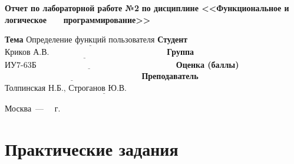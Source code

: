 \documentclass[12pt]{report}
\begin{document}
\begin{titlepage}
		\begin{center}
			\noindent\begin{minipage}{1.1\textwidth}\centering
				\Large\textbf{  Отчет по лабораторной работе №2}\newline
				\textbf{по дисциплине <<Функциональное и логическое}\newline
				\textbf{~~~программирование>>}\newline\newline
			\end{minipage}
		\end{center}
		
		\noindent\textbf{Тема} $\underline{\text{Определение функций пользователя}}$\newline\newline
		\noindent\textbf{Студент} $\underline{\text{Криков А.В.~~~~~~~~~~~~~~~~~~~~~~~~~~~~~~~~~~~~~~~~~~}}$\newline\newline
		\noindent\textbf{Группа} $\underline{\text{ИУ7-63Б~~~~~~~~~~~~~~~~~~~~~~~~~~~~~~~~~~~~~~~~~~~~~~~~~~}}$\newline\newline
		\noindent\textbf{Оценка (баллы)} $\underline{\text{~~~~~~~~~~~~~~~~~~~~~~~~~~~~~~~~~~~~~~~~~~~~~~~~~}}$\newline\newline
		\noindent\textbf{Преподаватель} $\underline{\text{Толпинская Н.Б., Строганов Ю.В.~~~~~~~~~~~~~~~~~~~~~~~~~~~~}}$\newline\newline\newline
		
		\begin{center}
			\vfill
			Москва~---~\the\year
			~г.
		\end{center}
	\end{titlepage}
	
	
	\chapter*{Практические задания}
\end{document}
